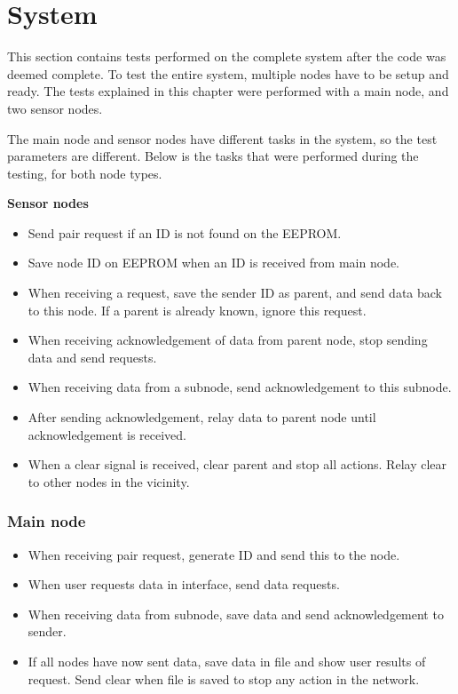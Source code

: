 \section{System}
This section contains tests performed on the complete system after the code was deemed complete. To test the entire system, multiple nodes have to be setup and ready. The tests explained in this chapter were performed with a main node, and two sensor nodes.

The main node and sensor nodes have different tasks in the system, so the test parameters are different. Below is the tasks that were performed during the testing, for both node types.

\textbf{Sensor nodes} \\
\begin{itemize}
\item Send pair request if an ID is not found on the EEPROM.
\item Save node ID on EEPROM when an ID is received from main node.
\item When receiving a request, save the sender ID as parent, and send data back to this node. If a parent is already known, ignore this request.
\item When receiving acknowledgement of data from parent node, stop sending data and send requests.
\item When receiving data from a subnode, send acknowledgement to this subnode.
\item After sending acknowledgement, relay data to parent node until acknowledgement is received.
\item When a clear signal is received, clear parent and stop all actions. Relay clear to other nodes in the vicinity.
\end{itemize}


\subsubsection*{Main node}
\begin{itemize}
\item When receiving pair request, generate ID and send this to the node.
\item When user requests data in interface, send data requests.
\item When receiving data from subnode, save data and send acknowledgement to sender.
\item If all nodes have now sent data, save data in file and show user results of request. Send clear when file is saved to stop any action in the network.
\end{itemize}

